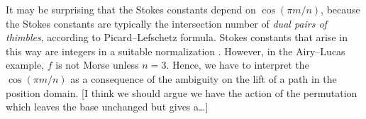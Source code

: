 \documentclass{article}
\newcommand{\laplace}{\mathcal{L}}
\theoremstyle{definition}
\theoremstyle{plain}
\newenvironment{todo}{\color{Coral}}{\color{black}}
\newenvironment{draft}{\color{SlateBlue}}{\color{black}}
\newenvironment{revised}{\color{DarkBlue}}{\color{black}}
\begin{document}
\begin{draft}
It may be surprising that the Stokes constants depend on $\cos(\pi m/n)$, because the Stokes constants are \begin{revised}typically\end{revised} the intersection number of \textit{dual pairs of thimbles}, according to Picard--Lefschetz formula. Stokes constants that arise in this way are integers in a suitable normalization \cite[Section 5]{pham}\cite[Chapter~1]{Arnold}. However, in the Airy--Lucas example, $f$ is not Morse unless $n=3$. Hence, we have to interpret the $\cos(\pi m/n)$ as a consequence of the ambiguity on the lift of a path in the position domain. \begin{todo}[I think we should argue we have the action of the permutation which leaves the base unchanged but gives a\ldots]\end{todo}
\end{draft}
%


%
\end{document}
